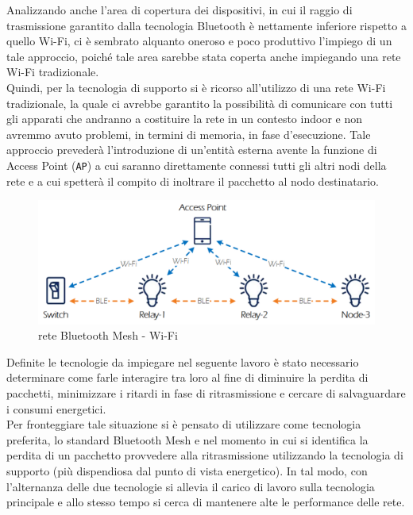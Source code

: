 Analizzando anche l'area di copertura dei dispositivi, in cui il raggio di trasmissione garantito dalla tecnologia Bluetooth è nettamente inferiore rispetto a quello Wi-Fi, ci è sembrato alquanto oneroso e poco produttivo l'impiego di un tale approccio, poiché tale area sarebbe stata coperta anche impiegando una rete Wi-Fi tradizionale.\\
Quindi, per la tecnologia di supporto si è ricorso all'utilizzo di una rete Wi-Fi tradizionale, la quale ci avrebbe garantito la possibilità di comunicare con tutti gli apparati che andranno a costituire la rete in un contesto indoor e non avremmo avuto problemi, in termini di memoria, in fase d'esecuzione. Tale approccio prevederà l'introduzione di un'entità esterna avente la funzione di Access Point (\texttt{AP}) a cui saranno direttamente connessi tutti gli altri nodi della rete e a cui spetterà il compito di inoltrare il pacchetto al nodo destinatario.

\begin{figure}[!ht]
    \centering
    \includegraphics[width = \textwidth]{images/BLE_WiFi_2.png}
    \caption{rete Bluetooth Mesh - Wi-Fi}
    \label{fig:mesh_network_wifi}
\end{figure}


\noindent Definite le tecnologie da impiegare nel seguente lavoro è stato necessario determinare come farle interagire tra loro al fine di diminuire la perdita di pacchetti, minimizzare i ritardi in fase di ritrasmissione e cercare di salvaguardare i consumi energetici.\\
Per fronteggiare tale situazione si è pensato di utilizzare come tecnologia preferita, lo standard Bluetooth Mesh e nel momento in cui si identifica la perdita di un pacchetto provvedere alla ritrasmissione utilizzando la tecnologia di supporto (più dispendiosa dal punto di vista energetico). In tal modo, con l'alternanza delle due tecnologie si allevia il carico di lavoro sulla tecnologia principale e allo stesso tempo si cerca di mantenere alte le performance delle rete.\\

